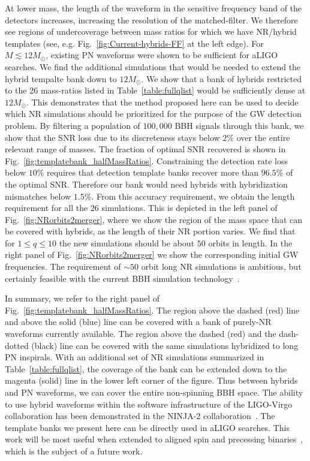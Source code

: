 At lower mass, the length of the waveform in the sensitive frequency
band of the detectors increases, increasing the resolution of 
the matched-filter. We therefore see regions of undercoverage 
between mass ratios for which we have NR/hybrid templates 
(see, e.g. Fig.~\ref{fig:Current-hybrids-FF} at the left edge).
For $M\lesssim 12M_\odot$, existing PN waveforms were shown to 
be sufficient for aLIGO searches. 
We find the additional simulations that would be needed to extend
the hybrid tempalte bank down to $12M_\odot$. We show that a bank
of hybrids restricted to the $26$ mass-ratios listed in 
Table~\ref{table:fullqlist} would be sufficiently dense at $12M_\odot$.
This demonstrates that the method proposed here can be used 
to decide which NR simulations should be prioritized for the purpose
of the GW detection problem.
By filtering a population of $100,000$ BBH signals
through this bank, we show that the SNR loss due to its discreteness
stays below $2\%$ over the entire relevant range of masses.
The fraction of optimal SNR recovered is shown in 
Fig.~\ref{fig:templatebank_halfMassRatios}. Constraining the 
detection rate loss below $10\%$ requires that detection template 
banks recover more than $96.5\%$ of the optimal SNR. Therefore
our bank would need hybrids with hybridization mismatches below 
$1.5\%$. From this accuracy requirement, we obtain the length
requirement for all the $26$ simulations. This is depicted in the 
left panel of Fig.~\ref{fig:NRorbits2merger}, where we show the region
of the mass space that can be covered with hybrids, as the length of 
their NR portion varies. We find that for $1\leq q\leq 10$  the 
new simulations should be about $50$ orbits in length. In the right 
panel of Fig.~\ref{fig:NRorbits2merger} we show the corresponding
initial GW frequencies. The requirement of $\sim 50$ orbit long NR
simulations is ambitious, but certainly feasible with the current BBH 
simulation technology~\cite{BelaLongSimulation}.

In summary, we refer to the right panel of
Fig.~\ref{fig:templatebank_halfMassRatios}.
The region above the dashed (red) line and above the solid (blue) line can
be covered with a bank of purely-NR waveforms currently available. The region
above the dashed (red) and the dash-dotted (black) line can be covered with
the same simulations hybridized to long PN inspirals. With an additional set
of NR simulations summarized in Table~\ref{table:fullqlist}, the coverage
of the bank can be extended down to the magenta (solid) line in the lower
left corner of the figure. Thus between hybrids and PN waveforms, 
we can cover the entire non-spinning BBH space. The ability to use hybrid
waveforms within the software infrastructure of the LIGO-Virgo collaboration 
has been demonstrated in the NINJA-2 collaboration~\cite{NINJA2:2013inPrep}.
The template banks we present here can be directly used in aLIGO searches. 
This work will be most useful when extended to aligned spin and 
precessing binaries~\cite{Boyle:2013nka,Schmidt:2012rh}, which is the
subject of a future work.

